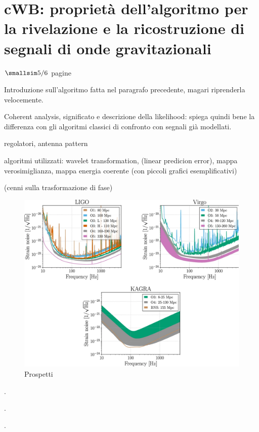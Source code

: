 \chapter[cWB]{cWB: proprietà dell'algoritmo per la rivelazione e la ricostruzione di segnali di onde gravitazionali}
\label{chapter:cwb}
\begin{center}
	$\smallsim 5/6$ pagine
\end{center}

Introduzione sull'algoritmo fatta nel paragrafo precedente, magari riprenderla velocemente.

Coherent analysis, significato e descrizione della likelihood: spiega quindi bene la differenza con gli algoritmi classici di confronto con segnali già modellati.

regolatori, antenna pattern

algoritmi utilizzati: wavelet transformation, (linear predicion error), mappa verosimiglianza, mappa energia coerente (con piccoli grafici esemplificativi)

(cenni sulla trasformazione di fase)

\begin{center}
	\begin{figure}[ht]
		\centering
		\includegraphics[scale=0.25, angle=0]{figures/Capitolo_3/noiseO4.pdf}
		\setlength{\belowcaptionskip}{-20pt}
		\caption{Prospetti \cite{Abbott_2020}}
		\label{fig:noiseO4}
	\end{figure}
\end{center}

\lipsum[3]\cite{Abbott_2017a}.

\lipsum[4]\cite{Klimenko_2008}.

\lipsum[6]\cite{Klimenko_2016}.